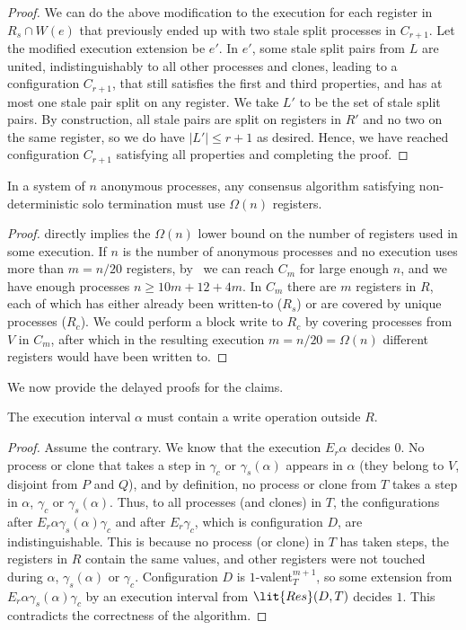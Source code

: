 \begin{proof}
We can do the above modification to the execution for each register in $R_s \cap W(e)$ 
  that previously ended up with two stale split processes in $C_{r+1}$.
Let the modified execution extension be $e'$.
In $e'$, some stale split pairs from $L$ are united, indistinguishably to all other processes and clones, 
  leading to a configuration $C_{r+1}$, that still satisfies the first and third properties,
  and has at most one stale pair split on any register.
We take $L'$ to be the set of stale split pairs.
By construction, all stale pairs are split on registers in $R'$ and no two on the same register, 
  so we do have $|L'| \leq r+1$ as desired.
Hence, we have reached configuration $C_{r+1}$ satisfying all properties and completing the proof.
\end{proof}
\begin{corollary}
In a system of $n$ anonymous processes, 
  any consensus algorithm satisfying non-deterministic solo termination must use $\Omega(n)$ registers.
\end{corollary}
\begin{proof}
 directly implies the $\Omega(n)$ lower bound on the number of registers used in some execution.
If $n$ is the number of anonymous processes and no execution uses more than $m = n/20$ registers,
  by~ we can reach $C_{m}$ for large enough $n$, and we have enough processes $n \geq 10m + 12 + 4m$.
In $C_{m}$ there are $m$ registers in $R$, each of which has either already been written-to ($R_s$)
  or are covered by unique processes ($R_c$).
We could perform a block write to $R_c$ by covering processes from $V$ in $C_{m}$, 
  after which in the resulting execution $m = n/20 = \Omega(n)$ different registers would have been written to.
\end{proof}
We now provide the delayed proofs for the claims.
\begin{claim}
\label{clm:alphaout}
The execution interval $\alpha$ must contain a write operation outside $R$.		 
\end{claim}
\begin{proof}
Assume the contrary.
We know that the execution $E_r \alpha$ decides $0$.
No process or clone that takes a step in $\gamma_c$ or $\gamma_s(\alpha)$ appears in $\alpha$
  (they belong to $V$, disjoint from $P$ and $Q$),  
  and by definition, no process or clone from $T$ takes a step in $\alpha$, $\gamma_c$ or $\gamma_s(\alpha)$. 
Thus, to all processes (and clones) in $T$, 
  the configurations after $E_r \alpha \gamma_s(\alpha) \gamma_c$ and after $E_r \gamma_c$,
  which is configuration $D$, are indistinguishable.
This is because no process (or clone) in $T$ has taken steps, the registers in $R$ contain the same values, 
  and other registers were not touched during $\alpha$, $\gamma_s(\alpha)$ or $\gamma_c$.
Configuration $D$ is $1$-valent$_T^{m+1}$, so some extension from $E_r \alpha \gamma_s(\alpha) \gamma_c$ by 
  an execution interval from $\lit{Res}(D, T)$ decides $1$.
This contradicts the correctness of the algorithm.
\end{proof}

